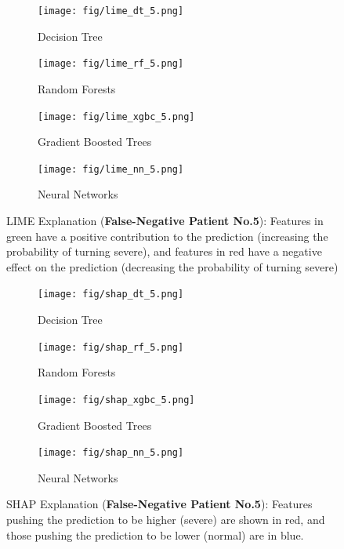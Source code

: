 \clearpage
\begin{figure}
\centering
\begin{subfigure}[b]{0.45\textwidth}
    \centering
    \texttt{[image: fig/lime\_dt\_5.png]}
    \caption{Decision Tree}
    \label{fig:lime_dt_5}
\end{subfigure}
\hfill
\begin{subfigure}[b]{0.45\textwidth}
    \centering
    \texttt{[image: fig/lime\_rf\_5.png]}
    \caption{Random Forests}
    \label{fig:lime_rf_5}
\end{subfigure}
\hfill
\begin{subfigure}[b]{0.45\textwidth}
    \centering
    \texttt{[image: fig/lime\_xgbc\_5.png]}
    \caption{Gradient Boosted Trees}
    \label{fig:lime_xgbc_5}
\end{subfigure}
\hfill
\begin{subfigure}[b]{0.45\textwidth}
    \centering
    \texttt{[image: fig/lime\_nn\_5.png]}
    \caption{Neural Networks}
    \label{fig:lime_nn_5}
\end{subfigure}
\caption{LIME Explanation (\textbf{False-Negative Patient No.5}): Features in green have a positive contribution to the prediction (increasing the probability of turning severe), and features in red have a negative effect on the prediction (decreasing the probability of turning severe)}
\label{fig:lime_5}
\end{figure}

\begin{figure}
\centering
\begin{subfigure}[b]{1.0\textwidth}
    \centering
    \texttt{[image: fig/shap\_dt\_5.png]}
    \caption{Decision Tree}
    \label{fig:shap_dt_5}
\end{subfigure}
\hfill
\begin{subfigure}[b]{1.0\textwidth}
    \centering
    \texttt{[image: fig/shap\_rf\_5.png]}
    \caption{Random Forests}
    \label{fig:shap_rf_5}
\end{subfigure}
\hfill
\begin{subfigure}[b]{1.0\textwidth}
    \centering
    \texttt{[image: fig/shap\_xgbc\_5.png]}
    \caption{Gradient Boosted Trees}
    \label{fig:shap_xgbc_5}
\end{subfigure}
\hfill
\begin{subfigure}[b]{1.0\textwidth}
    \centering
    \texttt{[image: fig/shap\_nn\_5.png]}
    \caption{Neural Networks}
    \label{fig:shap_nn_5}
\end{subfigure}
\hfill
\caption{SHAP Explanation (\textbf{False-Negative Patient No.5}): Features pushing the prediction to be higher (severe) are shown in red,  and those pushing the prediction to be lower (normal) are in blue.}
\label{fig:shap_5}
\end{figure}

